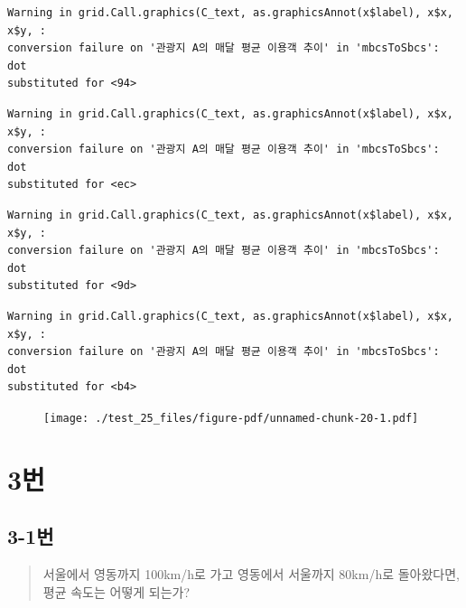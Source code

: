 \documentclass[
  letterpaper,
  DIV=11,
  numbers=noendperiod]{scrreprt}
\begin{document}
\begin{verbatim}
Warning in grid.Call.graphics(C_text, as.graphicsAnnot(x$label), x$x, x$y, :
conversion failure on '관광지 A의 매달 평균 이용객 추이' in 'mbcsToSbcs': dot
substituted for <94>
\end{verbatim}

\begin{verbatim}
Warning in grid.Call.graphics(C_text, as.graphicsAnnot(x$label), x$x, x$y, :
conversion failure on '관광지 A의 매달 평균 이용객 추이' in 'mbcsToSbcs': dot
substituted for <ec>
\end{verbatim}

\begin{verbatim}
Warning in grid.Call.graphics(C_text, as.graphicsAnnot(x$label), x$x, x$y, :
conversion failure on '관광지 A의 매달 평균 이용객 추이' in 'mbcsToSbcs': dot
substituted for <9d>
\end{verbatim}

\begin{verbatim}
Warning in grid.Call.graphics(C_text, as.graphicsAnnot(x$label), x$x, x$y, :
conversion failure on '관광지 A의 매달 평균 이용객 추이' in 'mbcsToSbcs': dot
substituted for <b4>
\end{verbatim}

\begin{figure}[H]

{\centering \texttt{[image: ./test\_25\_files/figure-pdf/unnamed-chunk-20-1.pdf]}

}

\end{figure}

\hypertarget{uxbc88-48}{%
\chapter*{3번}\label{uxbc88-48}}


\hypertarget{uxbc88-49}{%
\section*{3-1번}\label{uxbc88-49}}


\begin{quote}
서울에서 영동까지 100km/h로 가고 영동에서 서울까지 80km/h로 돌아왔다면,
평균 속도는 어떻게 되는가?
\end{quote}
\end{document}
